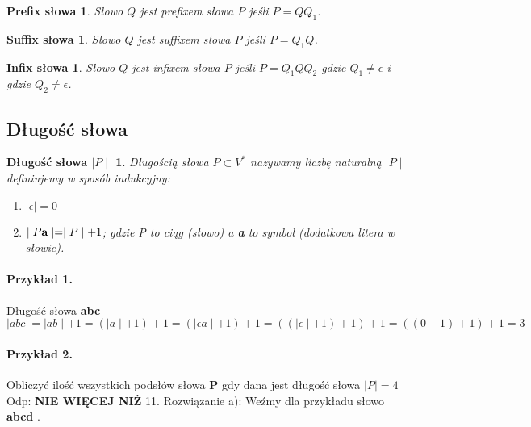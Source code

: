 \newtheorem*{theorem10*}{Prefix słowa}
\begin{theorem10*}
Słowo $Q$ jest prefixem słowa $P$ jeśli $P = QQ_{1}$.
\end{theorem10*}
 
\newtheorem*{theorem11*}{Suffix słowa}
\begin{theorem11*}
Słowo $Q$ jest suffixem słowa $P$ jeśli $P =Q_{1}Q$.
\end{theorem11*}

\newtheorem*{theorem12*}{Infix słowa}
\begin{theorem12*}
Słowo $Q$ jest infixem słowa $P$ jeśli $P =Q_{1}QQ_{2}$  \newline
gdzie $Q_{1}\neq \epsilon$ i gdzie $Q_{2} \neq \epsilon$.
\end{theorem12*}



\subsection{Długość słowa}
\newtheorem*{theorem13*}{Długość słowa $\mid P\mid$}
\begin{theorem13*}
Długością słowa $P \subset V^{*}$ nazywamy liczbę naturalną $\mid P\mid$ definiujemy w sposób indukcyjny:
 
\begin{enumerate}[label=(\roman*)]
  \item $ \mid  \epsilon \mid=0$
  \item $ \mid P{ \bf a}  \mid= \mid P \mid + 1$; gdzie P to ciąg (słowo) a {\bf a} to symbol (dodatkowa litera w słowie).
\end{enumerate} 
 
\end{theorem13*}


\paragraph{Przykład 1.}
Długość słowa {\bf abc} \newline
$\mid abc \mid = \mid ab \mid + 1 = ( \mid a \mid + 1) + 1 = 
(\mid \epsilon a \mid + 1) + 1 =   ((\mid \epsilon \mid + 1 )+1)+1 =
((0+1)+1)+1 = 3
$ 

\paragraph{Przykład 2.}
Obliczyć ilość wszystkich podsłów słowa {\bf P} gdy dana jest długość słowa $\mid P \mid = 4$ \newline
Odp: { \bf NIE WIĘCEJ NIŻ} 11. \newline
Rozwiązanie a):\newline
Weźmy dla przykładu słowo {\bf abcd }. 

